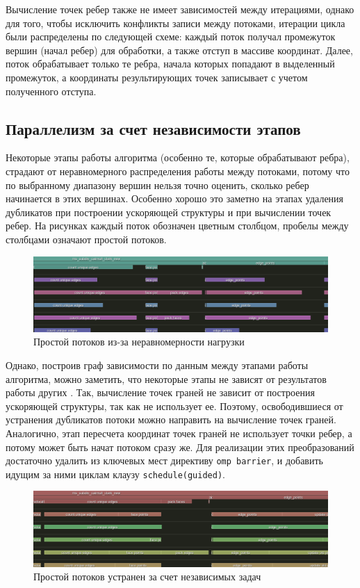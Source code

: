 \documentclass[14pt]{extarticle}
\begin{document}
Вычисление точек ребер также не имеет зависимостей между итерациями, однако для того, чтобы исключить конфликты записи между потоками, итерации цикла были распределены по следующей схеме: каждый поток получал промежуток вершин (начал ребер) для обработки, а также отступ в массиве координат. Далее, поток обрабатывает только те ребра, начала которых попадают в выделенный промежуток, а координаты результирующих точек записывает с учетом полученного отступа.

\subsection{Параллелизм за счет независимости этапов}
Некоторые этапы работы алгоритма (особенно те, которые обрабатывают ребра), страдают от неравномерного распределения работы между потоками, потому что по выбранному диапазону вершин нельзя точно оценить, сколько ребер начинается в этих вершинах. Особенно хорошо это заметно на этапах удаления дубликатов при построении ускоряющей структуры и при вычислении точек ребер. На рисунках каждый поток обозначен цветным столбцом, пробелы между столбцами означают простой потоков.

\begin{figure}[h]
  \centering
    \includegraphics[scale=0.45]{bad_threads.png}
  \caption{Простой потоков из-за неравномерности нагрузки}
\end{figure}

Однако, построив граф зависимости по данным между этапами работы алгоритма, можно заметить, что некоторые этапы не зависят от результатов работы других \cite{voevodin02}. Так, вычисление точек граней не зависит от построения ускоряющей структуры, так как не использует ее. Поэтому, освободившиеся от устранения дубликатов потоки можно направить на вычисление точек граней. Аналогично, этап пересчета координат точек граней не использует точки ребер, а потому может быть начат потоком сразу же. Для реализации этих преобразований достаточно удалить из ключевых мест директиву \texttt{omp barrier}, и добавить идущим за ними циклам клаузу \texttt{schedule(guided)}.

\begin{figure}[H]
    \centering
    \includegraphics[scale=0.45]{good_threads.png}
    \caption{Простой потоков устранен за счет независимых задач}
\end{figure}
\end{document}

